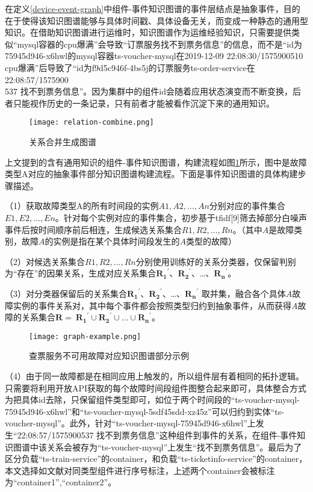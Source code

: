在定义\ref{device-event-graph}中组件-事件知识图谱的事件层结点是抽象事件，目的在于使得该知识图谱能够与具体时间戳、具体设备无关，而变成一种静态的通用型知识。在借助知识图谱进行运维时，知识图谱作为运维经验知识，只需要提供类似“mysql容器的cpu爆满”会导致“订票服务找不到票务信息”的信息，而不是“id为75945d946-x6hwl的mysql容器ts-voucher-mysql在2019-12-09 22:08:30/1575900510 cpu爆满”后导致了“id为f9d5c946f-4bs5j的订票服务ts-order-service在22:08:57/1575900\\537 找不到票务信息”。因为集群中的组件id会随着应用状态演变而不断变换，后者只能视作历史的一条记录，只有前者才能被看作沉淀下来的通用知识。
\begin{figure}[htbp]
    \centering
    \texttt{[image: relation-combine.png]}
    \caption{关系合并生成图谱\label{relation-combine}}
\end{figure}
上文提到的含有通用知识的组件-事件知识图谱，构建流程如图\ref{relation-combine}所示，图中是故障类型A对应的抽象事件部分知识图谱构建流程。下面是事件知识图谱的具体构建步骤描述。

（1）获取故障类型A的所有时间段的实例$A1,A2,…,An$分别对应的事件集合$E1,E2,…,En$。针对每个实例对应的事件集合，初步基于tfidf[9]筛去掉部分白噪声事件后按时间顺序前后相连，生成候选关系集合$R1,R2,…,Rn$。（其中$A$是故障类别，故障$A$的实例是指在某个具体时间段发生的$A$类型的故障）

（2）对候选关系集合$R1,R2,…,Rn$分别使用训练好的关系分类器，仅保留判别为“存在”的因果关系，生成对应关系集合${\mathbf{R}_\mathbf{1}}^\prime$、${\mathbf{R}_\mathbf{2}}^\prime$、…、${\mathbf{R}_\mathbf{n}}^\prime$。

（3）对分类器保留后的关系集合${\mathbf{R}_\mathbf{1}}^\prime$、${\mathbf{R}_\mathbf{2}}^\prime$、…、${\mathbf{R}_\mathbf{n}}^\prime$
取并集，融合各个具体$A$故障实例的事件关系对，其中每个事件都会按照类型归约到抽象事件，从而获得$A$故障的关系集合$\mathbf{R}=\ {\mathbf{R}_\mathbf{1}}^\prime\cup{\mathbf{R}_\mathbf{2}}^\prime\cup\ldots\cup{\mathbf{R}_\mathbf{n}}^\prime$。

\begin{figure}[htbp]
    \centering
    \texttt{[image: graph-example.png]}
    \caption{查票服务不可用故障对应知识图谱部分示例\label{graph-example}}
\end{figure}

（4）由于同一故障都是在相同应用上触发的，所以组件层有着相同的拓扑逻辑。只需要将利用开放API获取的每个故障时间段组件图整合起来即可，具体整合方式为把具体id去除，只保留组件类型即可，如位于两个时间段的“ts-voucher-mysql-75945d946-x6hwl”和“ts-voucher-mysql-5sdf45sdd-xz45z”可以归约到实体“ts-voucher-mysql”。此外，针对“ts-voucher-mysql-75945d946-x6hwl”上发生“22:08:57/1575900537 找不到票务信息”这种组件到事件的关系，在组件-事件知识图谱中该关系会被存为“ts-voucher-mysql”上发生“找不到票务信息”。最后为了区分负载“ts-train-service”的container，和负载“ts-ticketinfo-service”的container，本文选择如文献\cite{qiu2020causality-mining-knowledge-graph}对同类型组件进行序号标注，上述两个container会被标注为“container1”,“container2”。

